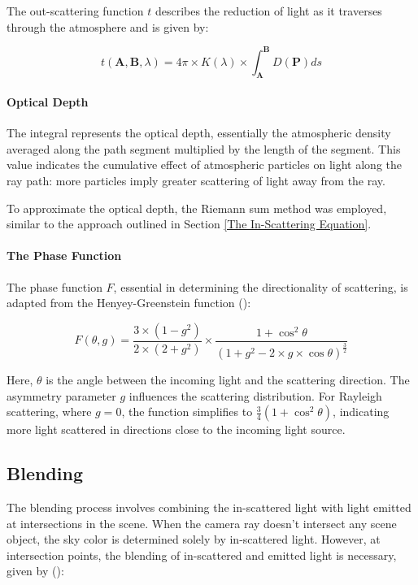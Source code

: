 The out-scattering function $t$ describes the reduction of light as it traverses through the atmosphere and is given by:

\begin{equation}
    t(\mathbf{A}, \mathbf{B}, \lambda) = 4\pi \times K(\lambda) \times \int_{\mathbf{A}}^{\mathbf{B}} D(\mathbf{P}) ds
\end{equation}

\paragraph{Optical Depth}

The integral represents the optical depth, essentially the atmospheric density averaged along the path segment multiplied by the length of the segment. This value indicates the cumulative effect of atmospheric particles on light along the ray path: more particles imply greater scattering of light away from the ray.

To approximate the optical depth, the Riemann sum method was employed, similar to the approach outlined in Section \ref{The In-Scattering Equation}.

\paragraph{The Phase Function}

The phase function $F$, essential in determining the directionality of scattering, is adapted from the Henyey-Greenstein function ():

\begin{equation}
    F(\theta, g) = \frac{3 \times (1 - g^2)}{2 \times (2 + g^2)} \times \frac{1 + \cos^2 \theta}{(1 + g^2 - 2 \times g \times \cos \theta)^{\frac{3}{2}}}
\end{equation}

Here, $\theta$ is the angle between the incoming light and the scattering direction. The asymmetry parameter $g$ influences the scattering distribution. For Rayleigh scattering, where $g = 0$, the function simplifies to $\frac{3}{4}(1 + \cos^2\theta)$, indicating more light scattered in directions close to the incoming light source.

\subsection{Blending}

The blending process involves combining the in-scattered light with light emitted at intersections in the scene. When the camera ray doesn't intersect any scene object, the sky color is determined solely by in-scattered light. However, at intersection points, the blending of in-scattered and emitted light is necessary, given by ():

